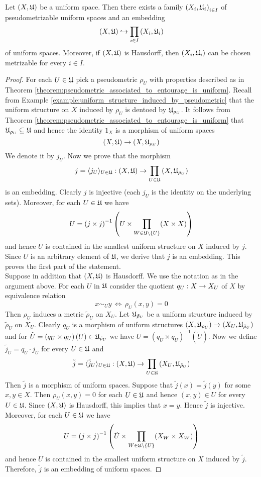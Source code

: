 \begin{theorem}\label{theorem:uniform_space_is_subspace_of_product_of_pseudometrizable_spaces}
Let $(X,{\mathfrak U})$ be a uniform space. Then there exists a family $\left(X_i,{\mathfrak U}_i\right)_{i\in I}$ of pseudometrizable uniform spaces and an embedding
$$\left(X,{\mathfrak U}\right)\hookrightarrow \prod_{i\in I}\left(X_i,{\mathfrak U}_i\right)$$
of uniform spaces. Moreover, if $\left(X,{\mathfrak U}\right)$ is Hausdorff, then $\left(X_i,{\mathfrak U}_i\right)$ can be chosen metrizable for every $i\in I$.
\end{theorem}
\begin{proof}
For each $U \in {\mathfrak U}$ pick a pseudometric $\rho_{U}$ with properties described as in Theorem \ref{theorem:pseudometric_associated_to_entourage_is_uniform}. Recall from Example \ref{example:uniform_structure_induced_by_pseudometric} that the uniform structure on $X$ induced by $\rho_U$ is dentoed by ${\mathfrak U}_{\rho_{U}}$. It follows from Theorem \ref{theorem:pseudometric_associated_to_entourage_is_uniform} that ${\mathfrak U}_{\rho_{U}}\subseteq {\mathfrak U}$ and hence the identity $1_X$ is a morphism of uniform spaces
$$\left(X,{\mathfrak U}\right)\rightarrow \left(X,{\mathfrak U}_{\rho_{U}}\right)$$
We denote it by $j_U$. Now we prove that the morphism 
$$j = \langle j_U\rangle_{U\in {\mathfrak U}}:\left(X,{\mathfrak U}\right)\rightarrow \prod_{U\in {\mathfrak U}}\left(X,{\mathfrak U}_{\rho_U}\right)$$
is an embedding. Clearly $j$ is injective (each $j_U$ is the identity on the underlying sets). Moreover, for each $U \in {\mathfrak U}$ we have
$$U = \left(j\times j\right)^{-1}\left(U\times \prod_{W\in {\mathfrak U}\setminus \{U\}}(X\times X)\right)$$
and hence $U$ is contained in the smallest uniform structure on $X$ induced by $j$. Since $U$ is an arbitrary element of ${\mathfrak U}$, we derive that $j$ is an embedding. This proves the first part of the statement.\\
Suppose in addition that $\left(X,{\mathfrak U}\right)$ is Hausdorff. We use the notation as in the argument above. For each $U$ in ${\mathfrak U}$ consider the quotient $q_U:X\rightarrow X_U$ of $X$ by equivalence relation 
$$x\sim_U y\,\Leftrightarrow\,\rho_U(x,y) = 0$$
Then $\rho_U$ induces a metric $\tilde{\rho}_U$ on $X_U$. Let ${\mathfrak U}_{\tilde{\rho}_U}$ be a uniform structure induced by $\tilde{\rho}_U$ on $X_U$. Clearly $q_U$ is a morphism of uniform structures $\left(X,{\mathfrak U}_{\rho_U}\right)\rightarrow \left(X_U,{\mathfrak U}_{\tilde{\rho}_U}\right)$ and for $\tilde{U} = \left(q_U\times q_U\right)(U) \in {\mathfrak U}_{\tilde{\rho}_U}$ we have $U = \left(q_U\times q_U\right)^{-1}\left(\tilde{U}\right)$. Now we define $\tilde{j}_U = q_U\cdot j_U$ for every $U \in {\mathfrak U}$ and 
$$\tilde{j} = \langle \tilde{j}_U\rangle_{U\in {\mathfrak U}}:\left(X,{\mathfrak U}\right)\rightarrow \prod_{U\in {\mathfrak U}}\left(X_U,{\mathfrak U}_{\tilde{\rho}_U}\right)$$
Then $\tilde{j}$ is a morphism of uniform spaces. Suppose that $\tilde{j}(x) = \tilde{j}(y)$ for some $x,y\in X$. Then $\rho_U(x,y) = 0$ for each $U \in {\mathfrak U}$ and hence $(x,y) \in U$ for every $U\in {\mathfrak U}$. Since $(X,{\mathfrak U})$ is Hausdorff, this implies that $x = y$. Hence $\tilde{j}$ is injective. Moreover, for each $U \in {\mathfrak U}$ we have
$$U = \left(j\times j\right)^{-1}\left(\tilde{U}\times \prod_{W\in {\mathfrak U}\setminus \{U\}}(X_W\times X_W)\right)$$
and hence $U$ is contained in the smallest uniform structure on $X$ induced by $\tilde{j}$. Therefore, $\tilde{j}$ is an embedding of uniform spaces.
\end{proof}

